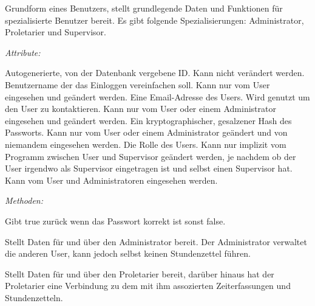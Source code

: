         \begin{itemize}
                Grundform eines Benutzers, stellt grundlegende Daten und Funktionen für spezialisierte Benutzer bereit.
                Es gibt folgende Spezialisierungen: Administrator, Proletarier und Supervisor.

                \emph{Attribute:}
                \begin{itemize}
                        Autogenerierte, von der Datenbank vergebene ID.
                        Kann nicht verändert werden.
                        Benutzername der das Einloggen vereinfachen soll.
                        Kann nur vom User eingesehen und geändert werden.
                        Eine Email-Adresse des Users.
                        Wird genutzt um den User zu kontaktieren.
                        Kann nur vom User oder einem Administrator eingesehen und geändert werden.
                        Ein kryptographischer, gesalzener Hash des Passworts.
                        Kann nur vom User oder einem Administrator geändert und von niemandem eingesehen werden.
                        Die Rolle des Users.
                        Kann nur implizit vom Programm zwischen User und Supervisor geändert werden, je nachdem ob der User irgendwo als Supervisor eingetragen ist und selbst einen Supervisor hat.
                        Kann vom User und Administratoren eingesehen werden.
                \end{itemize}
                \emph{Methoden:}
                \begin{itemize}
                        Gibt true zurück wenn das Passwort korrekt ist sonst false.
                \end{itemize}

                Stellt Daten für und über den Administrator bereit.
                Der Administrator verwaltet die anderen User, kann jedoch selbst keinen Stundenzettel führen.


                Stellt Daten für und über den Proletarier bereit, darüber hinaus hat der Proletarier eine Verbindung zu dem mit ihm assozierten Zeiterfassungen und Stundenzetteln.


\end{itemize}
